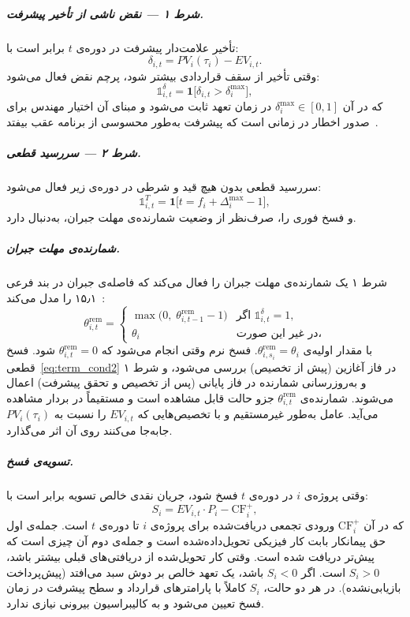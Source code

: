 \subparagraph{شرط ۱ --- نقض ناشی از تأخیر پیشرفت.}
تأخیر علامت‌دار پیشرفت در دوره‌ی $t$ برابر است با:
\begin{equation}
  \delta_{i,t} = PV_i(\tau_i) - EV_{i,t}.
  \label{eq:progress_lag}
\end{equation}
وقتی تأخیر از سقف قراردادی بیشتر شود، پرچم نقض فعال می‌شود:
\begin{equation}
  \mathbb{1}^{\delta}_{i,t}
    = \mathbf{1}\!\bigl[\delta_{i,t} > \delta^{\max}_i\bigr],
  \label{eq:term_cond1}
\end{equation}
که در آن $\delta^{\max}_i \in [0,1]$ در زمان تعهد ثابت می‌شود و مبنای
آن اختیار مهندس  برای صدور اخطار در زمانی است که پیشرفت
به‌طور محسوسی از برنامه عقب بیفتد~\citep{FIDIC2017}.

\subparagraph{شرط ۲ --- سررسید قطعی.}
سررسید قطعی بدون هیچ قید و شرطی در دوره‌ی زیر فعال می‌شود:
\begin{equation}
  \mathbb{1}^{T}_{i,t}
  = \mathbf{1}\!\bigl[t = f_i + \Delta^{\max}_i - 1\bigr],
  \label{eq:term_cond2}
\end{equation}
و فسخ فوری را، صرف‌نظر از وضعیت شمارنده‌ی مهلت جبران، به‌دنبال دارد.

\subparagraph{شمارنده‌ی مهلت جبران.}
شرط ۱ یک شمارنده‌ی مهلت جبران را فعال می‌کند که فاصله‌ی جبران در بند
فرعی ۱۵٫۱  را مدل می‌کند~\citep{FIDIC2017, Ndekugri2008}:
\begin{equation}
  \theta^{\mathrm{rem}}_{i,t}
    = \begin{cases}
        \max\!\bigl(0,\; \theta^{\mathrm{rem}}_{i,t-1} - 1\bigr)
          & \text{اگر } \mathbb{1}^{\delta}_{i,t} = 1, \\
        \theta_i
          & \text{در غیر این صورت،}
      \end{cases}
  \label{eq:counter}
\end{equation}
با مقدار اولیه‌ی $\theta^{\mathrm{rem}}_{i,s_i} = \theta_i$. فسخ نرم
وقتی انجام می‌شود که $\theta^{\mathrm{rem}}_{i,t} = 0$ شود. فسخ
قطعی~\eqref{eq:term_cond2} در فاز آغازین (پیش از تخصیص) بررسی می‌شود،
و شرط ۱ و به‌روزرسانی شمارنده در فاز پایانی (پس از تخصیص و تحقق
پیشرفت) اعمال می‌شوند. شمارنده‌ی $\theta^{\mathrm{rem}}_{i,t}$ جزو
حالت قابل مشاهده است و مستقیماً در بردار مشاهده می‌آید. عامل به‌طور
غیرمستقیم و با تخصیص‌هایی که $EV_{i,t}$ را نسبت به $PV_i(\tau_i)$
جابه‌جا می‌کنند روی آن اثر می‌گذارد.

\subparagraph{تسویه‌ی فسخ.}
وقتی پروژه‌ی $i$ در دوره‌ی $t$ فسخ شود، جریان نقدی خالص تسویه برابر
است با:
\begin{equation}
  S_i = EV_{i,t} \cdot P_i - \mathrm{CF}^+_i,
  \label{eq:settlement}
\end{equation}
که در آن $\mathrm{CF}^+_i$ ورودی تجمعی دریافت‌شده برای پروژه‌ی $i$ تا
دوره‌ی $t$ است. جمله‌ی اول حق پیمانکار بابت کار فیزیکی تحویل‌داده‌شده
است و جمله‌ی دوم آن چیزی است که پیش‌تر دریافت شده است. وقتی کار
تحویل‌شده از دریافتی‌های قبلی بیشتر باشد، $S_i > 0$ است. اگر
$S_i < 0$ باشد، یک تعهد خالص بر دوش سبد می‌افتد (پیش‌پرداخت بازیابی‌نشده).
در هر دو حالت، $S_i$ کاملاً با پارامترهای قرارداد و سطح پیشرفت در زمان
فسخ تعیین می‌شود و به کالیبراسیون بیرونی نیازی ندارد.

